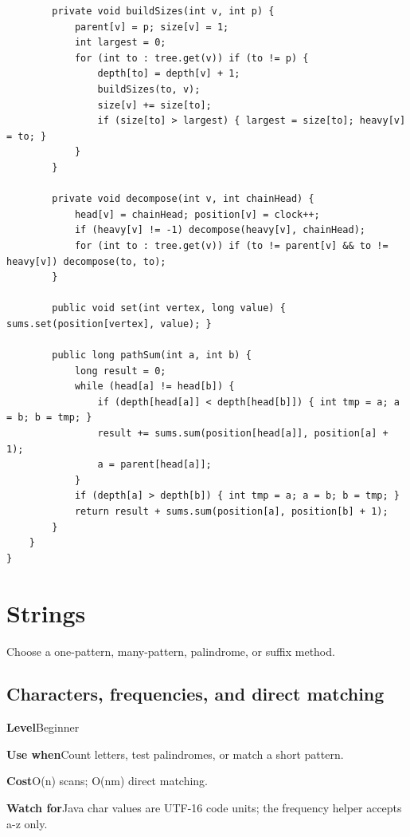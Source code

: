 \documentclass[10pt,letterpaper]{article}
\newcommand{\entrylabel}[1]{\textcolor{accent}{\bfseries #1}}
\begin{document}
\begin{lstlisting}
        private void buildSizes(int v, int p) {
            parent[v] = p; size[v] = 1;
            int largest = 0;
            for (int to : tree.get(v)) if (to != p) {
                depth[to] = depth[v] + 1;
                buildSizes(to, v);
                size[v] += size[to];
                if (size[to] > largest) { largest = size[to]; heavy[v] = to; }
            }
        }

        private void decompose(int v, int chainHead) {
            head[v] = chainHead; position[v] = clock++;
            if (heavy[v] != -1) decompose(heavy[v], chainHead);
            for (int to : tree.get(v)) if (to != parent[v] && to != heavy[v]) decompose(to, to);
        }

        public void set(int vertex, long value) { sums.set(position[vertex], value); }

        public long pathSum(int a, int b) {
            long result = 0;
            while (head[a] != head[b]) {
                if (depth[head[a]] < depth[head[b]]) { int tmp = a; a = b; b = tmp; }
                result += sums.sum(position[head[a]], position[a] + 1);
                a = parent[head[a]];
            }
            if (depth[a] > depth[b]) { int tmp = a; a = b; b = tmp; }
            return result + sums.sum(position[a], position[b] + 1);
        }
    }
}
\end{lstlisting}
\section{Strings}
\begin{guidebox}Choose a one-pattern, many-pattern, palindrome, or suffix method.\end{guidebox}
\subsection{Characters, frequencies, and direct matching}
\begin{guidebox}\small
\entrylabel{Level}\quad Beginner\par
\entrylabel{Use when}\quad Count letters, test palindromes, or match a short pattern.\par
\entrylabel{Cost}\quad O(n) scans; O(nm) direct matching.\par
\entrylabel{Watch for}\quad Java char values are UTF-16 code units; the frequency helper accepts a-z only.\par
\end{guidebox}
\end{document}
